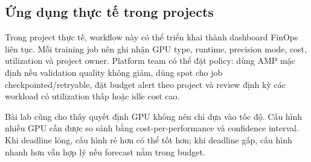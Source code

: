 \documentclass[12pt,a4paper]{article}
\begin{document}
\subsection{Ứng dụng thực tế trong projects}

Trong project thực tế, workflow này có thể triển khai thành dashboard FinOps liên tục.
Mỗi training job nên ghi nhận GPU type, runtime, precision mode, cost, utilization và project owner.
Platform team có thể đặt policy: dùng AMP mặc định nếu validation quality không giảm,
dùng spot cho job checkpointed/retryable, đặt budget alert theo project và review định kỳ các workload
có utilization thấp hoặc idle cost cao.

Bài lab cũng cho thấy quyết định GPU không nên chỉ dựa vào tốc độ.
Cấu hình nhiều GPU cần được so sánh bằng cost-per-performance và confidence interval.
Khi deadline lỏng, cấu hình rẻ hơn có thể tốt hơn; khi deadline gấp, cấu hình nhanh hơn vẫn hợp lý
nếu forecast nằm trong budget.
\end{document}
